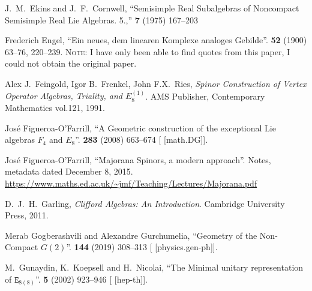 \begin{thebibliography}{99}
J.~M.~Ekins and J.~F.~Cornwell,
``Semisimple Real Subalgebras of Noncompact Semisimple Real Lie Algebras. 5.,''
 \textbf{7} (1975) 167--203
{\tt{}}

Frederich Engel,
``Ein neues, dem linearen Komplexe analoges Gebilde''.
\textbf{52} (1900) 63--76, 220--239.
\textsc{Note:} I have only been able to find quotes from this paper, I
could not obtain the original paper.

Alex J.\ Feingold, Igor B.\ Frenkel, John F.X.\ Ries,
\textit{Spinor Construction of Vertex Operator Algebras, Triality, and $E_{8}^{(1)}$}.
AMS Publisher, Contemporary Mathematics vol.121, 1991.

Jos\'e Figueroa-O'Farrill,
``A Geometric construction of the exceptional Lie algebras $F_{4}$ and $E_{8}$''.
 \textbf{283} (2008) 663--674
{\tt{}}
[ [math.DG]].

Jos\'e Figueroa-O'Farrill,
``Majorana Spinors, a modern approach''.
Notes, metadata dated December 8, 2015.
\url{https://www.maths.ed.ac.uk/~jmf/Teaching/Lectures/Majorana.pdf}

  
D.~J.~H.~Garling,
\textit{Clifford Algebras: An Introduction}.
Cambridge University Press, 2011.

Merab Gogberashvili and Alexandre Gurchumelia,
``Geometry of the Non-Compact $G(2)$''.
 \textbf{144} (2019) 308--313
{\tt{}}
[ [physics.gen-ph]].

M.~Gunaydin, K.~Koepsell and H.~Nicolai,
``The Minimal unitary representation of $\mathtt{E}_{8(8)}$''.
 \textbf{5} (2002) 923--946
{\tt{}}
[ [hep-th]].


\end{thebibliography}
